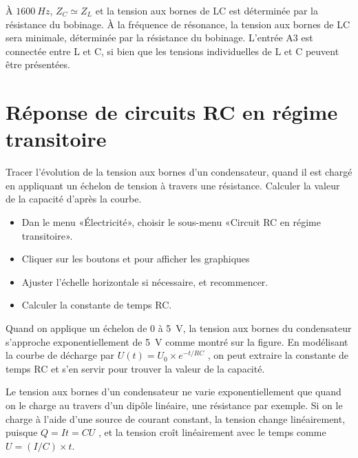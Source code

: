 \documentclass[a4paper,12pt,french]{sphinxmanual}
\let\sphinxpxdimen\pdfpxdimen\else\newdimen\sphinxpxdimen
\begin{document}
À \(1600~Hz\), \(Z_C \simeq Z_L\) et la tension aux bornes
de LC est déterminée par la résistance du bobinage. À la fréquence de
résonance, la tension aux bornes de LC sera minimale, déterminée par la
résistance du bobinage. L’entrée A3 est connectée entre L et C, si bien
que les tensions individuelles de L et C peuvent être présentées.


\section{Réponse de circuits RC en régime transitoire}
\label{\detokenize{4.2:reponse-de-circuits-rc-en-regime-transitoire}}\label{\detokenize{4.2::doc}}

Tracer l’évolution de la tension aux bornes d’un condensateur, quand il
est chargé en appliquant un échelon de tension à travers une résistance.
Calculer la valeur de la capacité d’après la courbe.

\noindent\sphinxincludegraphics[width=300\sphinxpxdimen]{{RCtransient}.pdf}
\noindent\sphinxincludegraphics[width=300\sphinxpxdimen]{{RCtransient}.pdf}

\begin{itemize}
\item {} 
Dan le menu «Électricité», choisir le sous-menu «Circuit RC en régime
transitoire».

\item {} 
Cliquer sur les boutons  et  pour
afficher les graphiques

\item {} 
Ajuster l’échelle horizontale si nécessaire, et recommencer.

\item {} 
Calculer la constante de temps RC.

\end{itemize}


Quand on applique un échelon de 0 à 5 V, la tension aux bornes du
condensateur s’approche exponentiellement de 5 V comme montré sur la
figure. En modélisant la courbe de décharge par
\(U(t) = U_0 \times e^{- t/RC}\) , on
peut extraire la constante de temps RC et s’en servir pour trouver la
valeur de la capacité.

Le tension aux bornes d’un condensateur ne varie exponentiellement que
quand on le charge au travers d’un dipôle linéaire, une résistance par
exemple. Si on le charge à l’aide d’une source de courant constant, la
tension change linéairement, puisque \(Q = It = CU\) , et la tension
croît linéairement avec le temps comme
\(U = (I/C) \times t\).
\end{document}
